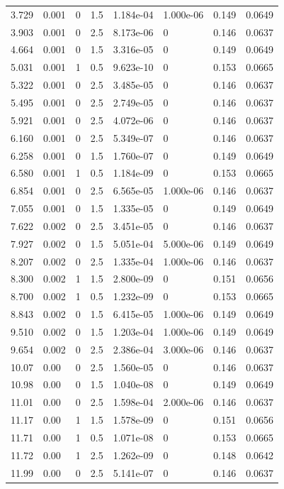 \documentclass[preview]{standalone}
\begin{document}
{{\begin{tabular}{L{1.2cm}C{1.2cm} C{0.3cm}C{0.5cm} C{1.4cm}C{1.4cm} C{1.4cm}C{1.4cm}}
  3.729  &  0.001  & 0     & 1.5 &  1.184e-04  & 1.000e-06  & 0.149 &  0.0649   \\ 
  3.903  &  0.001  & 0     & 2.5 &  8.173e-06  & 0  & 0.146 &  0.0637   \\ 
  4.664  &  0.001  & 0     & 1.5 &  3.316e-05  & 0  & 0.149 &  0.0649   \\ 
  5.031  &  0.001  & 1     & 0.5 &  9.623e-10  & 0  & 0.153 &  0.0665   \\ 
  5.322  &  0.001  & 0     & 2.5 &  3.485e-05  & 0  & 0.146 &  0.0637   \\ 
  5.495  &  0.001  & 0     & 2.5 &  2.749e-05  & 0  & 0.146 &  0.0637   \\ 
  5.921  &  0.001  & 0     & 2.5 &  4.072e-06  & 0  & 0.146 &  0.0637   \\ 
  6.160  &  0.001  & 0     & 2.5 &  5.349e-07  & 0  & 0.146 &  0.0637   \\ 
  6.258  &  0.001  & 0     & 1.5 &  1.760e-07  & 0  & 0.149 &  0.0649   \\ 
  6.580  &  0.001  & 1     & 0.5 &  1.184e-09  & 0  & 0.153 &  0.0665   \\ 
  6.854  &  0.001  & 0     & 2.5 &  6.565e-05  & 1.000e-06  & 0.146 &  0.0637   \\ 
  7.055  &  0.001  & 0     & 1.5 &  1.335e-05  & 0  & 0.149 &  0.0649   \\ 
  7.622  &  0.002  & 0     & 2.5 &  3.451e-05  & 0  & 0.146 &  0.0637   \\ 
  7.927  &  0.002  & 0     & 1.5 &  5.051e-04  & 5.000e-06  & 0.149 &  0.0649   \\ 
  8.207  &  0.002  & 0     & 2.5 &  1.335e-04  & 1.000e-06  & 0.146 &  0.0637   \\ 
  8.300  &  0.002  & 1     & 1.5 &  2.800e-09  & 0  & 0.151 &  0.0656   \\ 
  8.700  &  0.002  & 1     & 0.5 &  1.232e-09  & 0  & 0.153 &  0.0665   \\ 
  8.843  &  0.002  & 0     & 1.5 &  6.415e-05  & 1.000e-06  & 0.149 &  0.0649   \\ 
  9.510  &  0.002  & 0     & 1.5 &  1.203e-04  & 1.000e-06  & 0.149 &  0.0649   \\ 
  9.654  &  0.002  & 0     & 2.5 &  2.386e-04  & 3.000e-06  & 0.146 &  0.0637   \\ 
  10.07  &  0.00  & 0     & 2.5 &  1.560e-05  & 0  & 0.146 &  0.0637   \\ 
  10.98  &  0.00  & 0     & 1.5 &  1.040e-08  & 0  & 0.149 &  0.0649   \\ 
  11.01  &  0.00  & 0     & 2.5 &  1.598e-04  & 2.000e-06  & 0.146 &  0.0637   \\ 
  11.17  &  0.00  & 1     & 1.5 &  1.578e-09  & 0  & 0.151 &  0.0656   \\ 
  11.71  &  0.00  & 1     & 0.5 &  1.071e-08  & 0  & 0.153 &  0.0665   \\ 
  11.72  &  0.00  & 1     & 2.5 &  1.262e-09  & 0  & 0.148 &  0.0642   \\ 
  11.99  &  0.00  & 0     & 2.5 &  5.141e-07  & 0  & 0.146 &  0.0637   \\ 
\hline 
\end{tabular} 

}}
\end{document}
